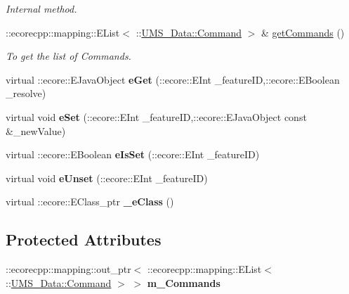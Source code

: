 \begin{DoxyCompactItemize}
\begin{DoxyCompactList}\small\item\em Internal method. \item\end{DoxyCompactList}\item 
::ecorecpp::mapping::EList$<$ ::\hyperlink{classUMS__Data_1_1Command}{UMS\_\-Data::Command} $>$ \& \hyperlink{classUMS__Data_1_1ListCommands_a9f9c017c138630dc30bb6b93f9b50dce}{getCommands} ()
\begin{DoxyCompactList}\small\item\em To get the list of Commands. \item\end{DoxyCompactList}\item 
\hypertarget{classUMS__Data_1_1ListCommands_a2c3d5de58321e97264d48f6c09b1def6}{
virtual ::ecore::EJavaObject {\bfseries eGet} (::ecore::EInt \_\-featureID,::ecore::EBoolean \_\-resolve)}
\label{classUMS__Data_1_1ListCommands_a2c3d5de58321e97264d48f6c09b1def6}

\item 
\hypertarget{classUMS__Data_1_1ListCommands_a507bf03d4f7b1984540faf1035bedad1}{
virtual void {\bfseries eSet} (::ecore::EInt \_\-featureID,::ecore::EJavaObject const \&\_\-newValue)}
\label{classUMS__Data_1_1ListCommands_a507bf03d4f7b1984540faf1035bedad1}

\item 
\hypertarget{classUMS__Data_1_1ListCommands_aa18caa231f88d67808fb31dbc29cbe6b}{
virtual ::ecore::EBoolean {\bfseries eIsSet} (::ecore::EInt \_\-featureID)}
\label{classUMS__Data_1_1ListCommands_aa18caa231f88d67808fb31dbc29cbe6b}

\item 
\hypertarget{classUMS__Data_1_1ListCommands_a7db0e87fef8071c3d2ac5e89ae6e8dc2}{
virtual void {\bfseries eUnset} (::ecore::EInt \_\-featureID)}
\label{classUMS__Data_1_1ListCommands_a7db0e87fef8071c3d2ac5e89ae6e8dc2}

\item 
\hypertarget{classUMS__Data_1_1ListCommands_a2d0c7ba6ec04ed7cdc25cc670ed1cbf4}{
virtual ::ecore::EClass\_\-ptr {\bfseries \_\-eClass} ()}
\label{classUMS__Data_1_1ListCommands_a2d0c7ba6ec04ed7cdc25cc670ed1cbf4}

\end{DoxyCompactItemize}
\subsection*{Protected Attributes}
\begin{DoxyCompactItemize}
\item 
\hypertarget{classUMS__Data_1_1ListCommands_ad95e8af9cbd34070ea4989a15d68cd94}{
::ecorecpp::mapping::out\_\-ptr$<$ ::ecorecpp::mapping::EList$<$ ::\hyperlink{classUMS__Data_1_1Command}{UMS\_\-Data::Command} $>$ $>$ {\bfseries m\_\-Commands}}
\label{classUMS__Data_1_1ListCommands_ad95e8af9cbd34070ea4989a15d68cd94}

\end{DoxyCompactItemize}


